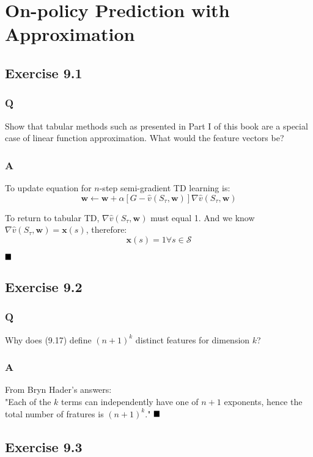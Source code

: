 \section{On-policy Prediction with Approximation}
\subsection{Exercise 9.1}
\subsubsection{Q}
Show that tabular methods such as presented in Part I of this book are a special case of linear function approximation. What would the feature vectors be?
\subsubsection{A}
To update equation for $n$-step semi-gradient TD learning is:
\begin{equation}
	\textbf{w} \leftarrow \textbf{w} + \alpha\left[G - \hat{v}(S_\tau, \textbf{w})\right] \nabla \hat{v}(S_\tau, \textbf{w})
\end{equation}

To return to tabular TD, $\nabla \hat{v}(S_\tau, \textbf{w})$ must equal 1. And we know $\nabla \hat{v}(S_\tau, \textbf{w}) = \textbf{x}(s)$, therefore:
\begin{equation}
\textbf{x}(s) = 1 \forall s \in \mathcal{S}
\end{equation}

$
\hfill \blacksquare
$

\subsection{Exercise 9.2}
\subsubsection{Q}
Why does (9.17) define $(n + 1)^k$ distinct features for dimension $k$?
\subsubsection{A}
From Bryn Hader's answers: \\
"Each of the $k$ terms can independently have one of $n+1$ exponents, hence the total number of fratures is $(n+1)^k$."
$
\hfill \blacksquare
$

\subsection{Exercise 9.3}
